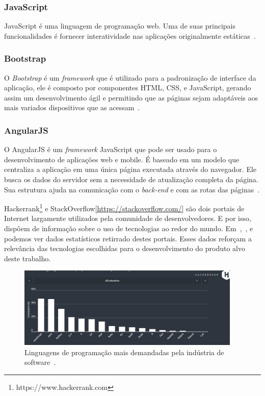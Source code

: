 \subsubsection{JavaScript}

JavaScript é uma linguagem de programação web.
Uma de suas principais funcionalidades é fornecer interatividade nas aplicações originalmente estáticas~\cite{de2016estudo}.

\subsubsection{Bootstrap}

O \textit{Bootstrap} é um \textit{framework} que é utilizado para a padronização de interface da aplicação, ele é composto por componentes HTML, CSS, e JavaScript, gerando assim um desenvolvimento ágil e permitindo que as páginas sejam adaptáveis aos mais variados dispositivos que as acessam~\cite{pereira2017ferramenta}. 

\subsubsection{AngularJS}

O AngularJS é um \textit{framework} JavaScript que pode ser usado para o desenvolvimento de aplicações web e mobile.
É baseado em um modelo que centraliza a aplicação em uma única página executada através do navegador.
Ele busca os dados do servidor sem a necessidade de atualização completa da página.
Sua estrutura ajuda na comunicação com o \textit{back-end} e com as rotas das páginas~\cite{de2016estudo}.

Hackerrank\footnote{https://www.hackerrank.com} e StackOverflow\ref{https://stackoverflow.com/} são dois portais de Internet largamente utilizados pela comunidade de desenvolvedores. E por isso, dispôem de informação sobre o uso de tecnologias ao redor do mundo.
Em~,~, e~ podemos ver dados estatísticos retirrado destes portais.
Esses dados reforçam a relevância das tecnologias escolhidas para o desenvolvimento do produto alvo deste trabalho.


\begin{figure}[htp]
    \centering
    \includegraphics[width=0.95\textwidth]{figuras/figura002.png}
    \caption{Linguagens de programação mais demandadas pela indústria de software~\cite{linguagemEframework}.}
    \label{Figura002}
\end{figure}

